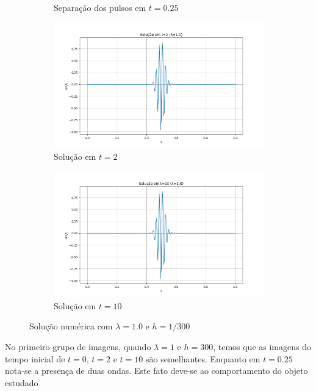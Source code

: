 \documentclass[column,amsmath,amssymb,floatfix]{revtex4}
\begin{document}
\begin{figure}[H]
\begin{subfigure}{0.35\textwidth}
		\caption{Separação dos pulsos em $t=0.25$}
		\label{fig:ex3_2}
	\end{subfigure}
	\begin{subfigure}{0.35\textwidth}
		\includegraphics[width=\textwidth]{img/ex0303.png}
		\caption{Solução em $t=2$}
		\label{fig:ex3_3}
	\end{subfigure}
	\begin{subfigure}{0.35\textwidth}
		\includegraphics[width=\textwidthUpdate main.py]{img/ex0304.png}
		\caption{Solução em $t=10$}
		\label{fig:ex3_4}
	\end{subfigure}
	\caption{Solução numérica com $\lambda=1.0$ e $h=1/300$}
	\label{fig:ex3_lambda1}
\end{figure}

No primeiro grupo de imagens, quando $\lambda=1$ e $h=300$, temos que as imagens do tempo inicial de $t=0$, $t=2$ e $t=10$ são semelhantes. Enquanto em $t=0.25$ nota-se a presença de duas ondas. Este fato deve-se ao comportamento do objeto estudado
\end{document}
